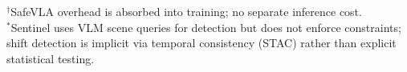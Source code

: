 \begin{table}[t]
\vspace{2pt}
{\footnotesize
$^\dagger$SafeVLA overhead is absorbed into training; no separate inference cost.\\
$^*$Sentinel uses VLM scene queries for detection but does not enforce constraints;
shift detection is implicit via temporal consistency (STAC) rather than explicit statistical testing.
}
\end{table}


%
